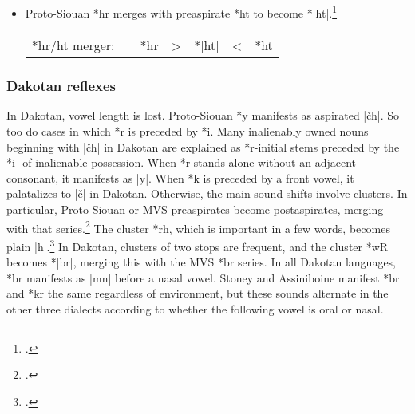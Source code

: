 \documentclass[output=paper]{LSP/langsci}
\begin{document}
\begin{itemize}
\item Proto-Siouan *hr merges with preaspirate *ht to become *|ht|.\footnote{\citealt[199]{CSD2006}.}


\begin{tabular}[t]{c c c c c c c }
*hr/ht merger: & &*hr & > & *|ht| & < & *ht
\end{tabular}
\end{itemize}

\subsubsection{Dakotan reflexes}

In Dakotan, vowel length is lost.  Proto-Siouan *y manifests as aspirated |\v{c}h|.  So too do cases in which *r is preceded by *i.  Many inalienably owned nouns beginning with |\v{c}h| in Dakotan are explained as *r-initial stems preceded by the *i- of inalienable possession.  When *r stands alone without an adjacent consonant, it manifests as |y|.  When *k is preceded by a front vowel, it palatalizes to |\v{c}| in Dakotan.  Otherwise, the main sound shifts involve clusters.  In particular, Proto-Siouan or MVS preaspirates become postaspirates, merging with that series.\footnote{\citealt[199, 269, 818]{CSD2006}.} The cluster *rh, which is important in a few words, becomes plain |h|.\footnote{\citealt[165]{CSD2006}.} In Dakotan, clusters of two stops are frequent, and the cluster *wR becomes *|br|, merging this with the MVS *br series. In all Dakotan languages, *br manifests as |mn| before a nasal vowel.  Stoney and Assiniboine manifest *br and *kr the same regardless of environment, but these sounds alternate in the other three dialects according to whether the following vowel is oral or nasal.
\end{document}
